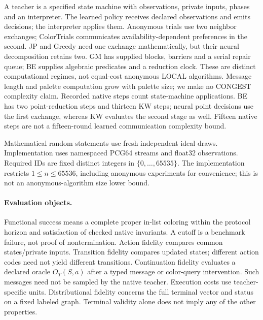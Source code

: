\documentclass[10pt]{article}
\begin{document}
A teacher is a specified state machine with observations, private inputs,
phases and an interpreter. The learned policy receives declared observations
and emits decisions; the interpreter applies them. Anonymous trials use two
neighbor exchanges; ColorTrials communicates availability-dependent
preferences in the second. JP and Greedy need one exchange mathematically,
but their neural decomposition retains two. GM has supplied blocks, barriers
and a serial repair queue; BE supplies algebraic predicates and a reduction
clock. These are distinct computational regimes, not equal-cost anonymous
LOCAL algorithms. Message length and palette computation grow with palette
size; we make no CONGEST complexity claim.
Recorded native steps count state-machine applications. BE has two
point-reduction steps and thirteen KW steps; neural point decisions use the
first exchange, whereas KW evaluates the second stage as well. Fifteen
native steps are not a fifteen-round learned communication complexity bound.

Mathematical random statements use fresh independent ideal draws.
Implementation uses namespaced PCG64 streams and float32 observations.
Required IDs are fixed distinct integers in $\{0,\ldots,65535\}$. The
implementation restricts $1\le n\le65536$, including anonymous experiments
for convenience; this is not an anonymous-algorithm size lower bound.

\paragraph{Evaluation objects.}
Functional success means a complete proper in-list coloring within the
protocol horizon and satisfaction of checked native invariants. A cutoff
is a benchmark failure, not proof of nontermination. Action fidelity compares
common states/private inputs. Transition fidelity compares updated states;
different action codes need not yield different transitions. Continuation
fidelity evaluates a declared oracle $O_T(S,a)$ after a typed message or
color-query intervention. Such messages need not be sampled by the native
teacher. Execution costs use teacher-specific units. Distributional fidelity
concerns the full terminal vector and status on a fixed labeled graph.
Terminal validity alone does not imply any of the other properties.


\end{document}
